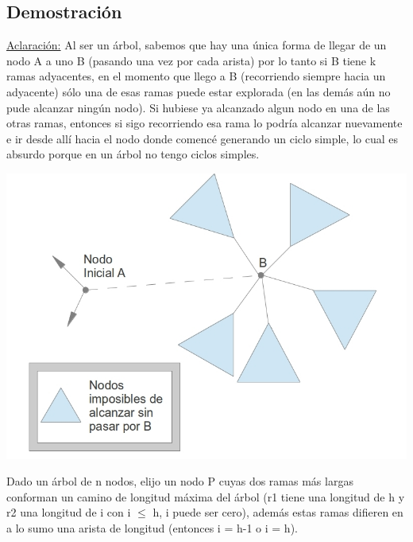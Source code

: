 \subsection{Demostración}

\underline{Aclaración:} Al ser un árbol, sabemos que hay una única forma de llegar de un nodo A a uno B (pasando una vez por cada arista) por lo tanto si B tiene k ramas adyacentes, en el momento que llego a B (recorriendo siempre hacia un adyacente) sólo una de esas ramas puede estar explorada (en las demás aún no pude alcanzar ningún nodo). Si hubiese ya alcanzado algun nodo en una de las otras ramas, entonces si sigo recorriendo esa rama lo podría alcanzar nuevamente e ir desde allí hacia el nodo donde comencé generando un ciclo simple, lo cual es absurdo porque en un árbol no tengo ciclos simples.
\begin{center}
\includegraphics[scale=0.5]{ej2/2/graficos/imagen02.jpg} 
\end{center}
Dado un árbol de n nodos, elijo un nodo P cuyas dos ramas más largas conforman un camino de longitud máxima del árbol (r1 tiene una longitud de h y r2 una longitud de i con i $\leq$ h, i puede ser cero), además estas ramas difieren en a lo sumo una arista de longitud (entonces i = h-1 o i = h).

